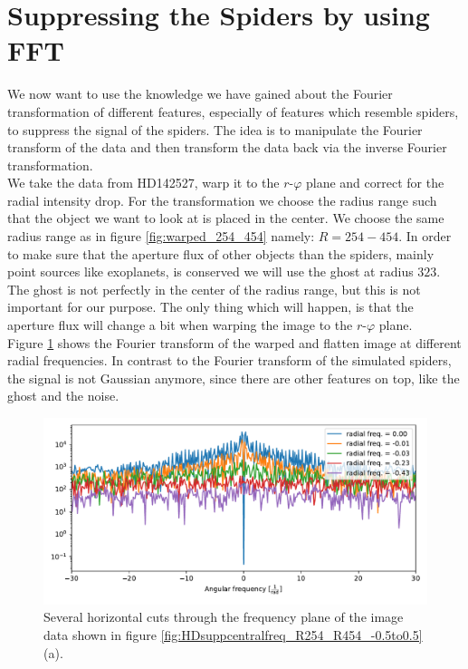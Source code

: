 \section{Suppressing the Spiders by using FFT}
We now want to use the knowledge we have gained about the Fourier transformation of different features, especially of features which resemble spiders, to suppress the signal of the spiders. The idea is to manipulate the Fourier transform of the data and then transform the data back via the inverse Fourier transformation.\\
We take the data from HD142527, warp it to the $r$-$\varphi$ plane and correct for the radial intensity drop. For the transformation we choose the radius range such that the object we want to look at is placed in the center. We choose the same radius range as in figure \ref{fig:warped_254_454} namely: $R=254-454$. In order to make sure that the aperture flux of other objects than the spiders, mainly point sources like exoplanets, is conserved we will use the ghost at radius $323$. The ghost is not perfectly in the center of the radius range, but this is not important for our purpose. The only thing which will happen, is that the aperture flux will change a bit when warping the image to the $r$-$\varphi$ plane.\\
Figure \ref{fig:rad0} shows the Fourier transform of the warped and flatten image at different radial frequencies. In contrast to the Fourier transform of the simulated spiders, the signal is not Gaussian anymore, since there are other features on top, like the ghost and the noise.
\begin{figure}[H]
	\centering
		\includegraphics[width=1.0\textwidth]{pics/rad0.pdf}
		\caption{Several horizontal cuts through the frequency plane of the image data shown in figure \ref{fig:HDsuppcentralfreq_R254_R454_-0.5to0.5}(a).}
		\label{fig:rad0}
\end{figure} 

